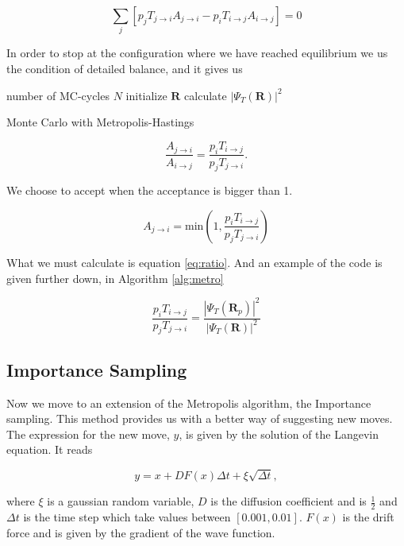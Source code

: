 $$\sum_j [p_j T_{j \rightarrow i}A_{j \rightarrow i} - p_i T_{i \rightarrow j}A_{i \rightarrow j}] = 0$$

In order to stop at the configuration where we have reached equilibrium we us the condition of detailed balance, and it gives us 

\begin{algorithm}
number of MC-cycles $N$\;
initialize $\mathbf{R}$\;
calculate $|\Psi_T(\mathbf{R})|^2$\;
 \caption{Monte Carlo with Metropolis-Hastings}\label{alg:metro}
\end{algorithm}

$$\frac{A_{j \rightarrow i}}{A_{i \rightarrow j}} = \frac{p_i T_{i \rightarrow j}}{p_j T_{j \rightarrow i}}.$$

We choose to accept when the acceptance is bigger than 1. 

$$A_{j \rightarrow i} = \mathrm{min} \left( 1, \frac{p_i T_{i \rightarrow j}}{p_j T_{j \rightarrow i}}\right)$$

What we must calculate is equation \ref{eq:ratio}. And an example of the code is given further down, in Algorithm \ref{alg:metro}

\begin{equation}\label{eq:ratio}
\frac{p_i T_{i \rightarrow j}}{p_j T_{j \rightarrow i}} = \frac{|\Psi_T(\mathbf{R}_p)|^2}{|\Psi_T(\mathbf{R})|^2}
\end{equation}

\subsection{Importance Sampling}

Now we move to an extension of the Metropolis algorithm, the Importance sampling. This method provides us with a better way of suggesting new moves. The expression for the new move, $y$, is given by the solution of the Langevin equation. It reads 

$$y = x + D F(x) \Delta t + \xi \sqrt{\Delta t},$$

where $\xi$ is a gaussian random variable, $D$ is the diffusion coefficient and is $\frac{1}{2}$ and $\Delta t$ is the time step which take values between $[0.001, 0.01]$.
$F(x)$ is the drift force and is given by the gradient of the wave function. 

